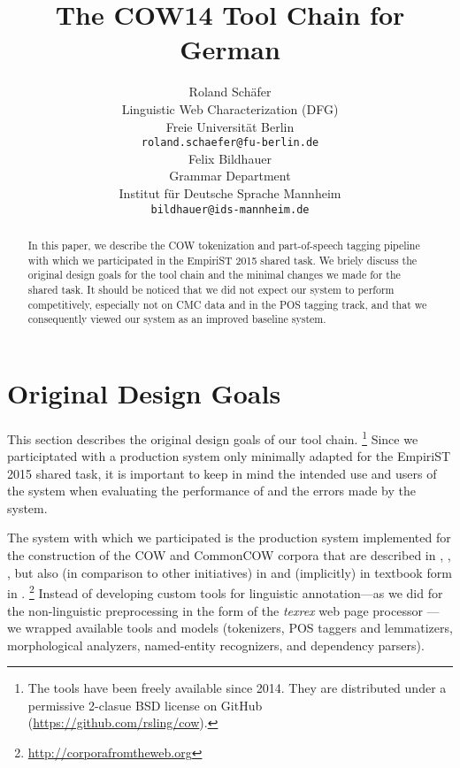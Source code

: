 \documentclass[11pt]{article}
\title{The COW14 Tool Chain for German}
\author{Roland Schäfer \\
  Linguistic Web Characterization (DFG) \\
  Freie Universität Berlin \\
  {\tt roland.schaefer@fu-berlin.de} \\\And
  Felix Bildhauer \\
  Grammar Department \\
  Institut für Deutsche Sprache Mannheim \\
  {\tt bildhauer@ids-mannheim.de} \\}
\date{}
\begin{document}
\maketitle

\begin{abstract}
  In this paper, we describe the COW tokenization and part-of-speech tagging pipeline with which we participated in the EmpiriST 2015 shared task.
  We briely discuss the original design goals for the tool chain and the minimal changes we made for the shared task.
  It should be noticed that we did not expect our system to perform competitively, especially not on CMC data and in the POS tagging track, and that we consequently viewed our system as an improved baseline system.
\end{abstract}

\section{Original Design Goals}
\label{sec:originaldesigngoals}

This section describes the original design goals of our tool chain.%
\footnote{The tools have been freely available since 2014.
  They are distributed under a permissive 2-clasue BSD license on GitHub (\url{https://github.com/rsling/cow}).}
Since we participtated with a production system only minimally adapted for the EmpiriST 2015 shared task, it is important to keep in mind the intended use and users of the system when evaluating the performance of and the errors made by the system.

The system with which we participated is the production system implemented for the construction of the COW and CommonCOW corpora that are described in , , , but also (in comparison to other initiatives) in  and (implicitly) in textbook form in .%
\footnote{\url{http://corporafromtheweb.org}}
Instead of developing custom tools for linguistic annotation---as we did for the non-linguistic preprocessing in the form of the \textit{texrex} web page processor \cite{SchaeferBildhauer2012a,Schaefer2015b,Schaefer2016c}---we wrapped available tools and models (tokenizers, POS taggers and lemmatizers, morphological analyzers, named-entity recognizers, and dependency parsers).
\end{document}
